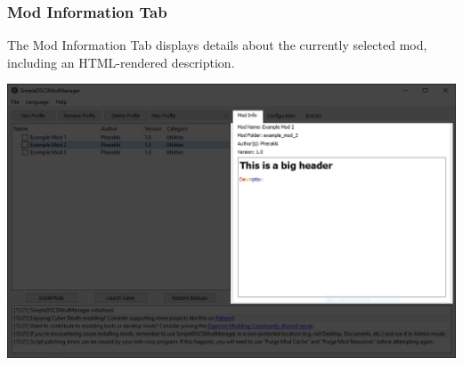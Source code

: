 \documentclass{article}
\begin{document}
\subsubsection{Mod Information Tab}
The Mod Information Tab displays details about the currently selected mod, including an HTML-rendered description.
\begin{center}
  \includegraphics[scale=0.4]{img/modmanager_ui_modinfo.jpg}
\end{center}

\newpage
\end{document}
